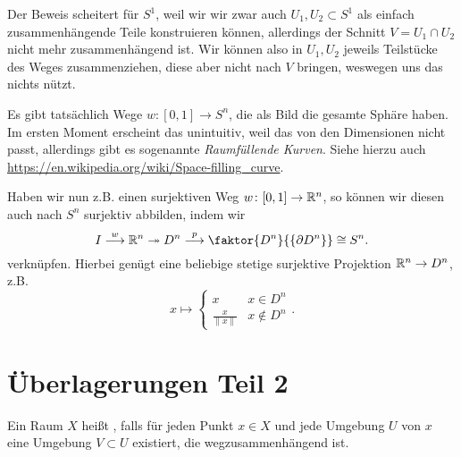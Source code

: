 \begin{oral}
    Der Beweis scheitert für $S^1$, weil wir wir zwar auch  $U_1,U_2\subset S^1$ als einfach zusammenhängende Teile konstruieren können, allerdings der Schnitt $V = U_1 \cap U_2$ nicht mehr zusammenhängend ist. Wir können also in $U_1,U_2$ jeweils Teilstücke des Weges zusammenziehen, diese aber nicht nach $V$ bringen, weswegen uns das nichts nützt.
\end{oral}

\begin{remark*}
    Es gibt tatsächlich Wege $w\colon [0,1] \to  S^n$, die als Bild die gesamte Sphäre haben. Im ersten Moment erscheint das unintuitiv, weil das von den Dimensionen nicht passt, allerdings gibt es sogenannte \textit{Raumfüllende Kurven}. Siehe hierzu auch \href{https://en.wikipedia.org/wiki/Space-filling_curve}{https://en.wikipedia.org/wiki/Space-filling\_curve}.

    Haben wir nun z.B. einen surjektiven Weg $w\colon [0,1] \to  \mathbb{R}^n$, so können wir diesen auch nach $S^n$ surjektiv abbilden, indem wir 
     \[
     I \stackrel{w}{\longrightarrow} \R^n \twoheadrightarrow  D^n \stackrel{p}{\longrightarrow} \faktor{D^n}{\left \{\partial D^n\right\} } \cong  S^n
    .\] 
    verknüpfen. Hierbei genügt eine beliebige stetige surjektive Projektion $\mathbb{R}^n \to  D^n$, z.B.
    \[
    x \mapsto \begin{cases}
        x & x \in D^n \\
        \frac{x}{\lVert x \rVert } & x \not\in D^n 
    \end{cases}
    .\] 
\end{remark*}

\section{Überlagerungen Teil 2}
\begin{definition}\label{def:lokal-wegzusammenhängend}
    Ein Raum $X$ heißt  , falls für jeden Punkt $x\in X$ und jede Umgebung $U$ von  $x$ eine Umgebung  $V\subset U$ existiert, die wegzusammenhängend ist. 
\end{definition}

